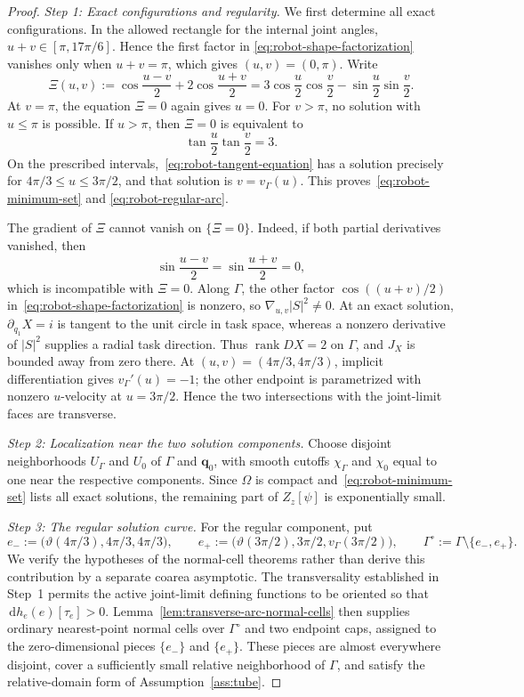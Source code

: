\documentclass[11pt]{amsart}
\numberwithin{equation}{section}
\theoremstyle{definition}
\theoremstyle{remark}
\DeclareMathOperator{\rank}{rank}
\newcommand{\dd}{\,\mathrm{d}}
\begin{document}
\begin{proof}
\smallskip
\noindent\emph{Step 1: Exact configurations and regularity.}
We first determine all exact configurations.  In the allowed rectangle for
the internal joint angles,
$u+v\in[\pi,17\pi/6]$.  Hence the first factor in
\eqref{eq:robot-shape-factorization} vanishes only when $u+v=\pi$, which gives
$(u,v)=(0,\pi)$.  Write
\[
 \Xi(u,v):=\cos\frac{u-v}{2}+2\cos\frac{u+v}{2}
 =3\cos\frac u2\cos\frac v2-\sin\frac u2\sin\frac v2.
\]
At $v=\pi$, the equation $\Xi=0$ again gives $u=0$.  For $v>\pi$, no solution
with $u\le\pi$ is possible.  If $u>\pi$, then $\Xi=0$ is equivalent to
\begin{equation}\label{eq:robot-tangent-equation}
 \tan\frac u2\tan\frac v2=3.
\end{equation}
On the prescribed intervals,~\eqref{eq:robot-tangent-equation} has a solution
precisely for $4\pi/3\le u\le3\pi/2$, and that solution is
$v=v_\Gamma(u)$.  This proves~\eqref{eq:robot-minimum-set} and
\eqref{eq:robot-regular-arc}.

The gradient of $\Xi$ cannot vanish on $\{\Xi=0\}$.  Indeed, if both partial
derivatives vanished, then
\[
 \sin\frac{u-v}{2}=\sin\frac{u+v}{2}=0,
\]
which is incompatible with $\Xi=0$.  Along $\Gamma$, the other factor
$\cos((u+v)/2)$ in~\eqref{eq:robot-shape-factorization} is nonzero, so
$\nabla_{u,v}|S|^2\ne0$.  At an exact solution,
$\partial_{q_1}X=i$ is tangent to the unit circle in task space, whereas a
nonzero derivative of $|S|^2$ supplies a radial task direction.  Thus
$\rank DX=2$ on $\Gamma$, and $J_X$ is bounded away from zero
there.  At $(u,v)=(4\pi/3,4\pi/3)$, implicit differentiation gives
$v_\Gamma'(u)=-1$; the other endpoint is parametrized with nonzero $u$-velocity at
$u=3\pi/2$.  Hence the two intersections with the joint-limit faces are
transverse.

\smallskip
\noindent\emph{Step 2: Localization near the two solution components.}
Choose disjoint neighborhoods $U_\Gamma$ and $U_0$ of $\Gamma$ and $\bm q_0$,
with smooth cutoffs $\chi_\Gamma$ and $\chi_0$ equal to one near the respective
components.  Since $\Omega$ is compact and~\eqref{eq:robot-minimum-set} lists
all exact solutions, the remaining part of $Z_z[\psi]$ is exponentially
small.

\smallskip
\noindent\emph{Step 3: The regular solution curve.}
For the regular component, put
\[
 e_-:=\bigl(\vartheta(4\pi/3),4\pi/3,4\pi/3\bigr),
 \qquad
 e_+:=\bigl(\vartheta(3\pi/2),3\pi/2,v_\Gamma(3\pi/2)\bigr),
 \qquad
 \Gamma^\circ:=\Gamma\setminus\{e_-,e_+\}.
\]
We verify the hypotheses of the normal-cell theorems rather than derive this
contribution by a separate coarea asymptotic.  The transversality established in
Step~1 permits the active joint-limit defining functions to be oriented so that
$\dd h_e(e)[\tau_e]>0$.  Lemma~\ref{lem:transverse-arc-normal-cells} then supplies
ordinary nearest-point normal cells over $\Gamma^\circ$ and two endpoint caps,
assigned to the zero-dimensional pieces $\{e_-\}$ and $\{e_+\}$.  These pieces
are almost everywhere disjoint, cover a sufficiently small relative
neighborhood of $\Gamma$, and satisfy the relative-domain form of
Assumption~\ref{ass:tube}.


\end{proof}
\end{document}

